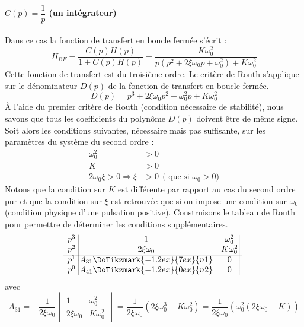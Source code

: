 \paragraph{$C(p)=\dfrac{1}{p}$ (un intégrateur)}
Dans ce cas la fonction de transfert en boucle fermée s'écrit :
\[
H_{BF}=\dfrac{C(p)H(p)}{1+C(p)H(p)}=
       \dfrac{K\omega_0^2}{p(p^2+2\xi\omega_0p+\omega_0^2)+K\omega_0^2}
\]
Cette fonction de transfert est du troisième ordre.
Le critère de Routh s'applique sur le dénominateur $D(p)$ de la fonction 
de transfert en boucle fermée.
\[
D(p)=p^3+2\xi\omega_0p^2+\omega_0^2p+K\omega_0^2
\]
\`A l'aide du premier critère de Routh (condition nécessaire de stabilité), nous
savons que tous les coefficients du polynôme $D(p)$ doivent être de même signe.
Soit alors les conditions suivantes, nécessaire mais pas suffisante, sur les 
paramètres du système du second ordre :
\begin{align*}
    \omega_0^2&>0 \\
    K&>0 \\
     2\omega_0\xi > 0 \Rightarrow\xi&> 0\:\:\text{( que si $\omega_0>0$)}
\end{align*}
Notons que la condition sur $K$ est différente par rapport au cas du second 
ordre pur et que la condition sur $\xi$ est retrouvée que si on impose 
une condition sur $\omega_0$ (condition physique d'une pulsation positive). 
Construisons le tableau de Routh pour permettre de déterminer les conditions 
supplémentaires.
\[
\begin{matrix}
    p^3 \\
    p^2 \\
    \hline
    p^1 \\
    p^0 \\
\end{matrix}
\begin{vmatrix}
    1     & \omega_0^2  \\
    2\xi\omega_0    & K\omega_0^2  \\
    \hline
    A_{31}\DoTikzmark{-1.2ex}{7ex}{n1}  & 0  \\
    A_{41}\DoTikzmark{-1.2ex}{0ex}{n2}  & 0    
    \end{vmatrix}
\]
avec
\[
A_{31}=-\dfrac{1}{2\xi\omega_0}
        \begin{vmatrix}
        1&\omega_0^2\\
        2\xi\omega_0&K\omega_0^2
        \end{vmatrix}
      = \dfrac{1}{2\xi\omega_0}(2\xi\omega_0^3-K\omega_0^2) = 
      \dfrac{1}{2\xi\omega_0}\left(\omega_0^2(2\xi\omega_0-K)\right)
\]
